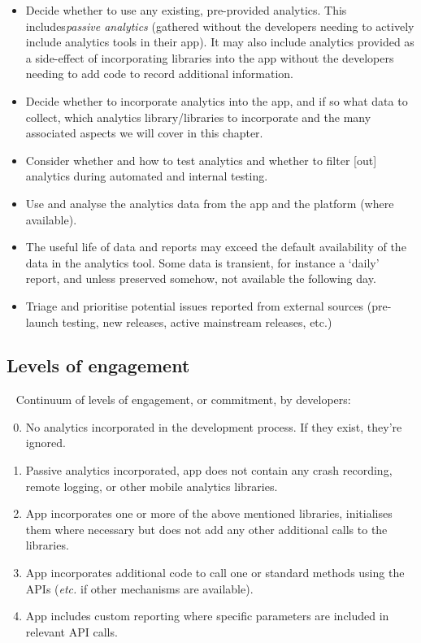 \begin{itemize}
    \item Decide whether to use any existing, pre-provided analytics. This includes\emph{passive analytics} (gathered without the developers needing to actively include analytics tools in their app). It may also include analytics provided as a side-effect of incorporating libraries into the app without the developers needing to add code to record additional information. 
    \item Decide whether to incorporate analytics into the app, and if so what data to collect, which analytics library/libraries to incorporate and the many associated aspects we will cover in this chapter.
    \item Consider whether and how to test analytics and whether to filter [out] analytics during automated and internal testing.
    \item Use and analyse the analytics data from the app and the platform (where available).
    \item The useful life of data and reports may exceed the default availability of the data in the analytics tool. Some data is transient, for instance a `daily' report, and unless preserved somehow, not available the following day.
    \item Triage and prioritise potential issues reported from external sources (pre-launch testing, new releases, active mainstream releases, etc.)
\end{itemize}

\subsection{Levels of engagement}~\label{subsection-levels-of-engagement}
Continuum of levels of engagement, or commitment, by developers:
\begin{enumerate}
    \setcounter{enumi}{-1} %
    \item No analytics incorporated in the development process. If they exist, they're ignored.
    \item Passive analytics incorporated, app does not contain any crash recording, remote logging, or other mobile analytics libraries.
    \item App incorporates one or more of the above mentioned libraries, initialises them where necessary but does not add any other additional calls to the libraries.
    \item App incorporates additional code to call one or standard methods using the APIs (\emph{etc.} if other mechanisms are available).
    \item App includes custom reporting where specific parameters are included in relevant API calls.
\end{enumerate}

